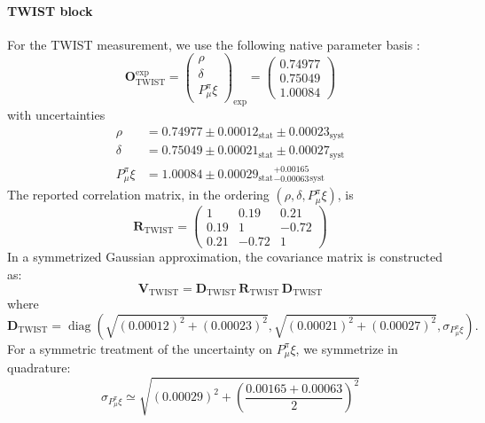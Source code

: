 \paragraph{TWIST block}
For the TWIST measurement, we use the following native parameter basis \cite{Hillairet2012precision,bueno2011precise}:
\begin{equation}
  \bm{O}^{\mathrm{exp}}_{\mathrm{TWIST}}
  =
  \begin{pmatrix}
    \rho\\
    \delta\\
    P_\mu^\pi\xi
  \end{pmatrix}_{\!\mathrm{exp}}
  =
  \begin{pmatrix}
    0.74977\\
    0.75049\\
    1.00084
  \end{pmatrix}
  \label{eq:twist-input}
\end{equation}
with uncertainties
\begin{align}
  \rho
  &=
  0.74977
  \pm0.00012_{\mathrm{stat}}
  \pm0.00023_{\mathrm{syst}}
  \\
  \delta
  &=
  0.75049
  \pm0.00021_{\mathrm{stat}}
  \pm0.00027_{\mathrm{syst}}
  \\
  P_\mu^\pi\xi
  &=
  1.00084
  \pm0.00029_{\mathrm{stat}}
  {}^{+0.00165}_{-0.00063}{}_{\mathrm{syst}}
\end{align}
The reported correlation matrix, in the ordering
$\left(\rho,\delta,P_\mu^\pi\xi\right)$, is
\begin{equation}
  \bm{R}_{\mathrm{TWIST}}
  =
  \begin{pmatrix}
    1    & 0.19  & 0.21\\
    0.19 & 1     & -0.72\\
    0.21 & -0.72 & 1
  \end{pmatrix}
  \label{eq:twist-correlation}
\end{equation}
In a symmetrized Gaussian approximation, the covariance matrix is
constructed as:
\begin{equation}
  \bm{V}_{\mathrm{TWIST}}
  =
  \bm{D}_{\mathrm{TWIST}}\,
  \bm{R}_{\mathrm{TWIST}}\,
  \bm{D}_{\mathrm{TWIST}}
  \label{eq:twist-covariance}
\end{equation}
where
\begin{equation}
  \bm{D}_{\mathrm{TWIST}}
  =
  \operatorname{diag}
  \left(
    \sqrt{(0.00012)^2+(0.00023)^2},
    \sqrt{(0.00021)^2+(0.00027)^2},
    \sigma_{P_\mu^\pi\xi}
  \right).
\end{equation}
For a symmetric treatment of the uncertainty on $P_\mu^\pi\xi$, we symmetrize in quadrature:
\begin{equation}
  \sigma_{P_\mu^\pi\xi}
  \simeq
  \sqrt{
    (0.00029)^2+
    \left(\frac{0.00165+0.00063}{2}\right)^2
  }
  \label{eq:twist-xi-error}
\end{equation}

